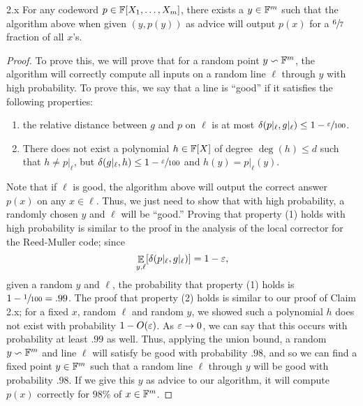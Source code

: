 \documentclass[11pt]{article}
\begin{document}
\begin{claim}{2.x}
    For any codeword $p \in \mathbb{F}[X_1, \ldots, X_m]$, there exists a $y \in \mathbb{F}^m$ such that the algorithm above when given $(y, p(y))$ as advice will output $p(x)$ for a $\sfrac{6}{7}$ fraction of all $x$'s.
\end{claim}

\begin{proof}
    To prove this, we will prove that for a random point $y \backsim \mathbb{F}^m$, the algorithm will correctly compute all inputs on a random line $\ell$ through $y$ with high probability. To prove this, we say that a line is ``good'' if it satisfies the following properties:
    \begin{enumerate}
        \item[(1)] the relative distance between $g$ and $p$ on $\ell$ is at most $\delta(p|_\ell, g|_\ell) \leq 1 - \sfrac{\varepsilon}{100}$.
        \item[(2)] There does not exist a polynomial $h \in \mathbb{F}[X]$ of degree $\deg (h) \leq d$ such that $h \neq p|_\ell$, but $\delta(g|_\ell, h) \leq 1 - \sfrac{\varepsilon}{100}$ and $h(y) = p|_\ell(y)$.
    \end{enumerate}
    Note that if $\ell$ is good, the algorithm above will output the correct answer $p(x)$ on any $x \in \ell$. Thus, we just need to show that with high probability, a randomly chosen $y$ and $\ell$ will be ``good.'' Proving that property (1) holds with high probability is similar to the proof in the analysis of the local corrector for the Reed-Muller code; since
    \begin{equation*}
        \mathop{\mathbb{E}}_{y, \ell}[\delta(p|_\ell, g|_\ell)] = 1 - \varepsilon,
    \end{equation*}
    given a random $y$ and $\ell$, the probability that property (1) holds is $1 - \sfrac{1}{100} = .99$. The proof that property (2) holds is similar to our proof of Claim 2.x; for a fixed $x$, random $\ell$ and random $y$, we showed such a polynomial $h$ does not exist with probability $1 - O(\varepsilon)$. As $\varepsilon \rightarrow 0$, we can say that this occurs with probability at least $.99$ as well. Thus, applying the union bound, a random $y \backsim \mathbb{F}^m$ and line $\ell$ will satisfy be good with probability $.98$, and so we can find a fixed point $y \in \mathbb{F}^m$ such that a random line $\ell$ through $y$ will be good with probability $.98$. If we give this $y$ as advice to our algorithm, it will compute $p(x)$ correctly for $98$\% of $x \in \mathbb{F}^m$. 
\end{proof}
\end{document}
